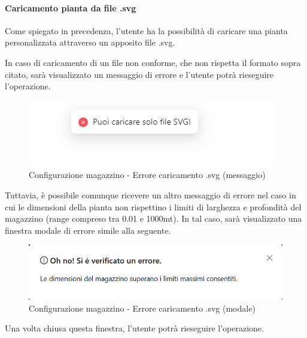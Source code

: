             \paragraph{Caricamento pianta da file .svg} \label{sec:creazione:configurazione:svg}
            Come spiegato in precedenza, l'utente ha la possibilità di caricare una pianta personalizzata attraverso un apposito file .svg.
            
            In caso di caricamento di un file non conforme, che non rispetta il formato sopra citato, sarà visualizzato un messaggio di errore e l'utente potrà rieseguire l'operazione. 
            \begin{figure}[h!]
                \centering
                \includegraphics[]{images/errore_caricamento_svg.png}
                \caption{Configurazione magazzino - Errore caricamento .svg (messaggio)}
            \end{figure}

            Tuttavia, è possibile comunque ricevere un altro messaggio di errore nel caso in cui le dimensioni della pianta non rispettino i limiti di larghezza e profondità del magazzino (range compreso tra 0.01 e 1000mt). In tal caso, sarà visualizzato una finestra modale di errore simile alla seguente.
            \begin{figure}[H]
                \centering
                \includegraphics[]{images/svg_error_modal.png}
                \caption{Configurazione magazzino - Errore caricamento .svg (modale)}
            \end{figure}
            \noindent Una volta chiusa questa finestra, l'utente potrà rieseguire l'operazione.
        
        
